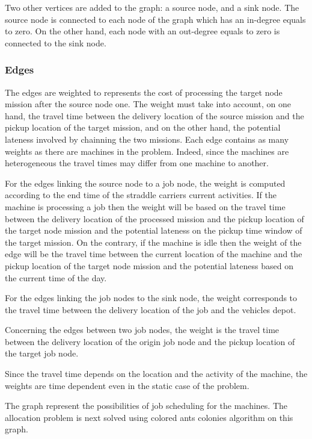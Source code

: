 \documentclass[a4paper,10pt]{article}
\begin{document}
Two other vertices are added to the graph: a source node, and a sink node. The source node is connected to each node of the graph which has an in-degree equals to zero. On the other hand, each node with an out-degree equals to zero is connected to the sink node. %


\subsubsection{Edges}
The edges are weighted to represents the cost of processing the target node mission after the source node one. The weight must take into account, on one hand, the travel time between the delivery location of the source mission and the pickup location of the target mission, and on the other hand, the potential lateness involved by chainning the two missions. Each edge contains as many weights as there are machines in the problem. Indeed, since the machines are heterogeneous the travel times may differ from one machine to another.

For the edges linking the source node to a job node, the weight is computed according to the end time of the straddle carriers current activities. If the machine is processing a job then the weight will be based on the travel time between the delivery location of the processed mission and the pickup location of the target node mission and the potential lateness on the pickup time window of the target mission. On the contrary, if the machine is idle then the weight of the edge will be the travel time between the current location of the machine and the pickup location of the target node mission and the potential lateness based on the current time of the day.

For the edges linking the job nodes to the sink node, the weight corresponds to the travel time between the delivery location of the job and the vehicles depot.

Concerning the edges between two job nodes, the weight is the travel time between the delivery location of the origin job node and the pickup location of the target job node.

Since the travel time depends on the location and the activity of the machine, the weights are time dependent even in the static case of the problem.

The graph represent the possibilities of job scheduling for the machines. The allocation problem is next solved using colored ants colonies algorithm on this graph.
\end{document}
